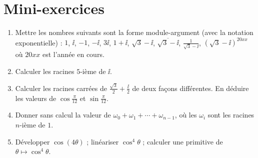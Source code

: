 \section{Mini-exercices}

\begin{frame}
\begin{miniexercice}
\begin{enumerate}
  \item Mettre les nombres suivants sont la forme module-argument (avec la notation exponentielle) :
$1$, $\ii$, $-1$, $-\ii$, $3\ii$, $1+\ii$, $\sqrt{3}-\ii$, $\overline{\sqrt{3}-\ii}$, $\frac{1}{\sqrt{3}-\ii}$, $(\sqrt{3}-\ii)^{20xx}$
où $20xx$ est l'année en cours.
  \item Calculer les racines $5$-ième de $\ii$. 
  \item Calculer les racines carrées de $\frac{\sqrt{3}}{2}+\frac{\ii}{2}$ de deux façons différentes.
En déduire les valeurs de $\cos \frac{\pi}{12}$ et $\sin \frac{\pi}{12}$.
  \item Donner sans calcul la valeur de $\omega_0 + \omega_1 + \cdots + \omega_{n-1}$, 
où les $\omega_i$ sont les racines $n$-ième de $1$.
  \item Développer $\cos (4\theta)$ ; linéariser $\cos^4 \theta$ ; calculer une primitive de $\theta\mapsto\cos^4 \theta$.
\end{enumerate}
\end{miniexercice}
\end{frame}



